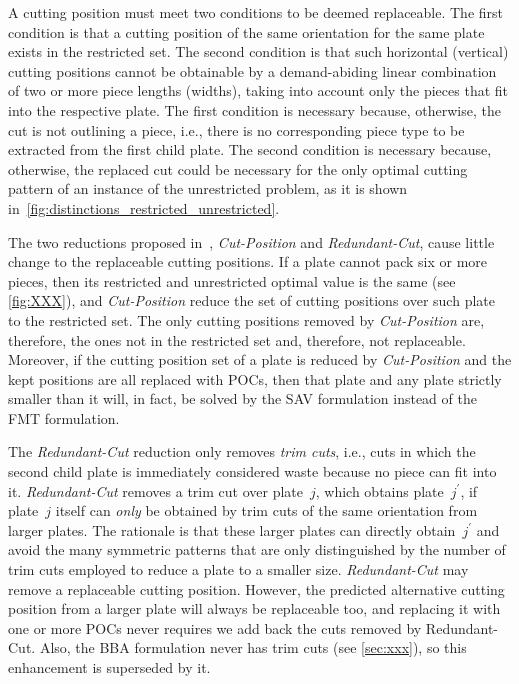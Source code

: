 \documentclass[ppgc,tese,english,formais,babel]{iiufrgs}
\begin{document}
A cutting position must meet two conditions to be deemed replaceable.
The first condition is that a cutting position of the same orientation for the same plate exists in the restricted set.
The second condition is that such horizontal (vertical) cutting positions cannot be obtainable by a demand-abiding linear combination of two or more piece lengths (widths), taking into account only the pieces that fit into the respective plate.
The first condition is necessary because, otherwise, the cut is not outlining a piece, i.e., there is no corresponding piece type to be extracted from the first child plate.
The second condition is necessary because, otherwise, the replaced cut could be necessary for the only optimal cutting pattern of an instance of the unrestricted problem, as it is shown in~\cref{fig:distinctions_restricted_unrestricted}.

The two reductions proposed in~\cite{furini:2016}, \emph{Cut-Position} and \emph{Redundant-Cut}, cause little change to the replaceable cutting positions.
If a plate cannot pack six or more pieces, then its restricted and unrestricted optimal value is the same (see \cref{fig:XXX}), and \emph{Cut-Position} reduce the set of cutting positions over such plate to the restricted set.
The only cutting positions removed by \emph{Cut-Position} are, therefore, the ones not in the restricted set and, therefore, not replaceable.
Moreover, if the cutting position set of a plate is reduced by \emph{Cut-Position} and the kept positions are all replaced with POCs, then that plate and any plate strictly smaller than it will, in fact, be solved by the SAV formulation instead of the FMT formulation.

The \emph{Redundant-Cut} reduction only removes \emph{trim cuts}, i.e., cuts in which the second child plate is immediately considered waste because no piece can fit into it.
\emph{Redundant-Cut} removes a trim cut over plate~\(j\), which obtains plate~\(j^\prime\), if plate~\(j\) itself can \emph{only} be obtained by trim cuts of the same orientation from larger plates. The rationale is that these larger plates can directly obtain~\(j^\prime\) and avoid the many symmetric patterns that are only distinguished by the number of trim cuts employed to reduce a plate to a smaller size.
\emph{Redundant-Cut} may remove a replaceable cutting position. However, the predicted alternative cutting position from a larger plate will always be replaceable too, and replacing it with one or more POCs never requires we add back the cuts removed by Redundant-Cut.
Also, the BBA formulation never has trim cuts (see \cref{sec:xxx}), so this enhancement is superseded by it.
\end{document}
